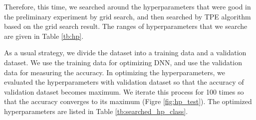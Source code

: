 \documentclass[useamsfonts]{pasj01}
\begin{document}
Therefore, this time, we searched around the hyperparameters that were good in the preliminary experiment by grid search, and then searched by TPE algorithm based 
on the grid search result.
The ranges of hyperparameters that we searche are given in Table \ref{tb:hp}.

As a usual strategy, we divide the dataset into a training data and a validation dataset.
We use the training data for optimizing DNN, and use the validation data for measuring the accuracy.
In optimizing the hyperparameters, we evaluated the hyperparameters with validation dataset so
that the accuracy of validation dataset becomes maximum.
We iterate this process for 100 times so that the accuracy converges to its maximum (Figre \ref{fig:hp_test}).
The optimized hyperparameters are listed in Table \ref{tb:searched_hp_class}.
\end{document}
